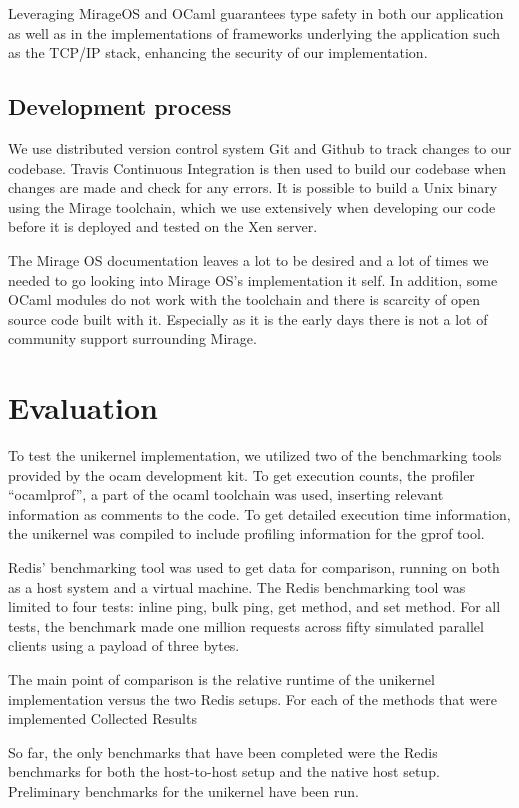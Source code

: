 \documentclass[english,10pt,twocolumn]{article}
\begin{document}
Leveraging MirageOS and OCaml guarantees type safety in both our application as well as in the implementations of frameworks underlying the application such as the TCP/IP stack, enhancing the security of our implementation.

\subsection{Development process}

We use distributed version control system Git and Github to track changes to our codebase. Travis Continuous Integration is then used to build our codebase when changes are made and check for any errors. It is possible to build a Unix binary using the Mirage toolchain, which we use extensively when developing our code before it is deployed and tested on the Xen server. 

The Mirage OS documentation leaves a lot to be desired and a lot of times we needed to go looking into Mirage OS's implementation it self. In addition, some OCaml modules do not work with the toolchain and there is scarcity of open source code built with it. Especially as it is the early days there is not a lot of community support surrounding Mirage.


\section{Evaluation}

To test the unikernel implementation, we utilized two of the benchmarking tools provided by the  ocam development kit. To get execution counts, the profiler “ocamlprof”, a part of the ocaml toolchain was used, inserting relevant information as comments to the code. To get detailed execution time information, the unikernel was compiled to include profiling information for the gprof tool.

Redis’ benchmarking tool was used to get data for comparison, running on both as a host system and a virtual machine. The Redis benchmarking tool was limited to four tests: inline ping, bulk ping, get method, and set method. For all tests, the benchmark made one million requests across fifty simulated parallel clients using a payload of three bytes.

The main point of comparison is the relative runtime of the unikernel implementation versus the two Redis setups. For each of the methods that were implemented
Collected Results

So far, the only benchmarks that have been completed were the Redis benchmarks for both the host-to-host setup and the native host setup. Preliminary benchmarks for the unikernel have been run.
\end{document}
